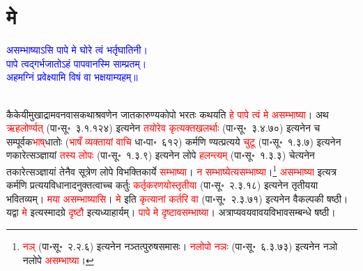 \section[मे]{मे}
\centering\textcolor{blue}{असम्भाष्याऽसि पापे मे घोरे त्वं भर्तृघातिनी।\nopagebreak\\
पापे त्वद्गर्भजातोऽहं पापवानस्मि साम्प्रतम्।\nopagebreak\\
अहमग्निं प्रवेक्ष्यामि विषं वा भक्षयाम्यहम्॥}\nopagebreak\\
\\
\begin{sloppypar}\justifying\noindent\hspace{10mm} कैकेयी\-मुखाद्राम\-वन\-वास\-कथा\-श्रवणेन जात\-कारुण्य\-कोपो भरतः कथयति \textcolor{red}{हे पापे त्वं मे असम्भाष्या}। अथ \textcolor{red}{ऋहलोर्ण्यत्‌} (पा॰सू॰~३.१.१२४) इत्यनेन \textcolor{red}{तयोरेव कृत्य\-क्त\-खलर्थाः} (पा॰सू॰~३.४.७०) इत्यनेन च सम्पूर्वक\-\textcolor{red}{भाष्‌}\-धातोः (\textcolor{red}{भाषँ व्यक्तायां वाचि} धा॰पा॰~६१२) कर्मणि ण्यत्प्रत्यये \textcolor{red}{चुटू} (पा॰सू॰~१.३.७) इत्यनेन णकारेत्सञ्ज्ञायां \textcolor{red}{तस्य लोपः} (पा॰सू॰~१.३.९) इत्यनेन लोपे \textcolor{red}{हलन्त्यम्‌} (पा॰सू॰~१.३.३) चेत्यनेन तकारेत्सञ्ज्ञायां तेनैव सूत्रेण लोपे विभक्ति\-कार्ये \textcolor{red}{सम्भाष्या}। \textcolor{red}{न सम्भाष्येत्यसम्भाष्या}।\footnote{\textcolor{red}{नञ्‌} (पा॰सू॰~२.२.६) इत्यनेन नञ्तत्पुरुषसमासः। \textcolor{red}{नलोपो नञः} (पा॰सू॰~६.३.७३) इत्यनेन नञो नलोपे \textcolor{red}{असम्भाष्या}।} \textcolor{red}{असम्भाष्या} इत्यत्र कर्मणि प्रत्यय\-विधानादनुक्तत्वाच्च कर्तुः \textcolor{red}{कर्तृकरणयोस्तृतीया} (पा॰सू॰~२.३.१८) इत्यनेन तृतीयया भवितव्यम्। \textcolor{red}{मया असम्भाष्यासि}। \textcolor{red}{मे} इति \textcolor{red}{कृत्यानां कर्तरि वा} (पा॰सू॰~२.३.७१) इत्यनेन वैकल्पकी षष्ठी। यद्वा \textcolor{red}{मे} इत्यस्मादग्रे \textcolor{red}{दृष्टौ} इत्यध्याहार्यम्। \textcolor{red}{पापे मे दृष्टावसम्भाष्या}। अत्राप्यवयवावयवि\-भाव\-सम्बन्धे षष्ठी।\end{sloppypar}
